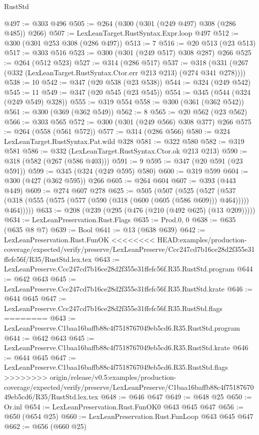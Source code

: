 \begin{lexlean}{RustStd}
\begin{coremodule}
{\begin{coremodule}
{{{{{{{@497 := @303 @496
@505 := @264 (@300 (@301 (@249 @497) @308 (@286 @485)) @266)
@507 := LexLeanTarget.RustSyntax.Expr.loop @497
@512 := @300 (@301 @253 @308 (@286 @497))
@513 := 7
@516 := @20 @513 (@23 @513)
@517 := @303 @516
@523 := @300 (@301 (@249 @517) @308 @287) @266
@525 := @264 (@512 @523)
@527 := @314 (@286 @517)
@537 := @318 (@331 (@267 (@332 (LexLeanTarget.RustSyntax.Ctor.err @213 @213) (@274 @341 @278))))
@538 := 10
@542 := @347 (@20 @538 (@23 @538))
@544 := @324 (@249 @542)
@545 := 11
@549 := @347 (@20 @545 (@23 @545))
@554 := @345 (@544 (@324 (@249 @549) @328))
@555 := @319 @554
@558 := @300 (@361 (@362 @542))
@561 := @300 (@369 (@362 @549))
@562 := 8
@565 := @20 @562 (@23 @562)
@566 := @303 @565
@572 := @300 (@301 (@249 @566) @308 @377) @266
@575 := @264 (@558 (@561 @572))
@577 := @314 (@286 @566)
@580 := @324 LexLeanTarget.RustSyntax.Pat.wild @328
@581 := @322 @580
@582 := @319 @581
@586 := @332 (LexLeanTarget.RustSyntax.Ctor.ok @213 @213)
@590 := @318 (@582 (@267 (@586 @403)))
@591 := 9
@595 := @347 (@20 @591 (@23 @591))
@599 := @345 (@324 (@249 @595) @580)
@600 := @319 @599
@604 := @300 (@427 (@362 @595)) @266
@605 := @264 @604
@607 := @393 (@443 @449)
@609 := @274 @607 @278
@625 := @505
    (@507
      (@525
        (@527
          (@537 (@318 (@555 (@575 (@577 (@590 (@318 (@600 (@605 (@586 @609))) @464))))) @464)))))
@633 := @208 (@239 (@295 (@476 (@210 (@492 @625) (@13 @209)))))
@634 := LexLeanPreservation.Rust.Flags
@635 := Prod.{0, 0}
@638 := @635 (@635 @8 @7)
@639 := Bool
@641 := @13 (@638 @639)
@642 := LexLeanPreservation.Rust.FunOK
<<<<<<<< HEAD:examples/production-coverage/expected/verify/preserve/LexLeanPreserve/Ccc247cd7b16ce28d2f355e31ffefc56f/R35/RustStd.lex.tex
@643 := LexLeanPreserve.Ccc247cd7b16ce28d2f355e31ffefc56f.R35.RustStd.program
@644 := @642 @643
@645 := LexLeanPreserve.Ccc247cd7b16ce28d2f355e31ffefc56f.R35.RustStd.krate
@646 := @644 @645
@647 := LexLeanPreserve.Ccc247cd7b16ce28d2f355e31ffefc56f.R35.RustStd.flags
========
@643 := LexLeanPreserve.C1baa16baffb88c4f7518767049eb5cd6.R35.RustStd.program
@644 := @642 @643
@645 := LexLeanPreserve.C1baa16baffb88c4f7518767049eb5cd6.R35.RustStd.krate
@646 := @644 @645
@647 := LexLeanPreserve.C1baa16baffb88c4f7518767049eb5cd6.R35.RustStd.flags
>>>>>>>> origin/release/v0.5:examples/production-coverage/expected/verify/preserve/LexLeanPreserve/C1baa16baffb88c4f7518767049eb5cd6/R35/RustStd.lex.tex
@648 := @646 @647
@649 := @648 @25
@650 := Or.inl
@654 := LexLeanPreservation.Rust.FunOK0 @643 @645 @647
@656 := @650 (@654 @25)
@660 := LexLeanPreservation.Rust.FunLoop @643 @645 @647
@662 := @656 (@660 @25)
}}}}}}}
\end{coremodule}}
\end{coremodule}
\end{lexlean}
